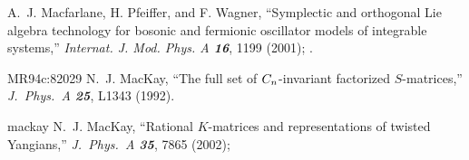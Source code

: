 
 A.~J.  Macfarlane, H.  Pfeiffer, and F.  Wagner,
    ``Symplectic and orthogonal Lie algebra technology for
      bosonic and fermionic oscillator models of integrable systems,''
    {\em Internat. J. Mod. Phys. A \bf 16},  1199 (2001); %
        .


        {MR94c:82029} N.~J. MacKay,
``The full set of $C\sb n$-invariant factorized
  $S$-matrices,''
{\em J.~Phys.~A  \bf 25}, L1343 (1992).

        {mackay} N.~J. MacKay,
``Rational $K$-matrices and representations of twisted Yangians,''
{\em J.~Phys.~A  \bf 35}, 7865 (2002); %


%


